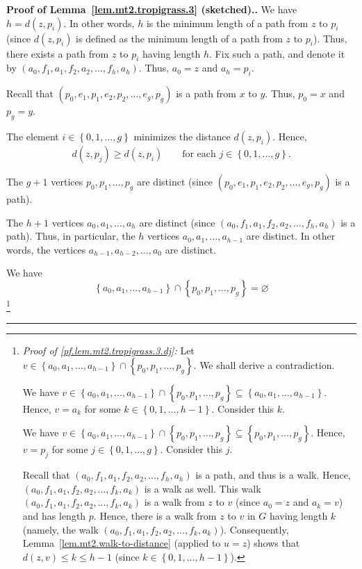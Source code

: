 \documentclass[numbers=enddot,12pt,final,onecolumn,notitlepage]{scrartcl}%
\theoremstyle{definition}
\newenvironment{proof}[1][Proof]{\noindent\textbf{#1.} }{\ \rule{0.5em}{0.5em}}
\newcommand{\set}[1]{\left\{ #1 \right\}}
\newcommand{\tup}[1]{\left( #1 \right)}
\begin{document}
\begin{proof}[Proof of Lemma~\ref{lem.mt2.tropigrass.3} (sketched).]
We have $h = d \tup{z, p_i}$.
In other words, $h$ is the minimum length of a path from $z$
to $p_i$ (since $d \tup{z, p_i}$ is defined as
the minimum length of a path from $z$ to $p_i$).
Thus, there exists a path from $z$ to $p_i$ having length $h$.
Fix such a path, and denote it by
$\tup{a_0, f_1, a_1, f_2, a_2, \ldots, f_h, a_h}$.
Thus, $a_0 = z$ and $a_h = p_i$.

Recall that $\tup{p_0, e_1, p_1, e_2, p_2, \ldots, e_g, p_g}$
is a path from $x$ to $y$.
Thus, $p_0 = x$ and $p_g = y$.

The element $i \in \set{0, 1, \ldots, g}$ minimizes the
distance $d \tup{z, p_i}$. Hence,
\begin{equation}
d \tup{z, p_j} \geq d \tup{z, p_i}
\qquad \text{for each } j \in \set{0, 1, \ldots, g} .
\label{pf.lem.mt2.tropigrass.3.min}
\end{equation}

The $g+1$ vertices $p_0, p_1, \ldots, p_g$ are
distinct
(since $\tup{p_0, e_1, p_1, e_2, p_2, \ldots, e_g, p_g}$ is a
path).

The $h+1$ vertices $a_0, a_1, \ldots, a_h$
are distinct
(since $\tup{a_0, f_1, a_1, f_2, a_2, \ldots, f_h, a_h}$
is a path).
Thus, in particular, the $h$ vertices
$a_0, a_1, \ldots, a_{h-1}$ are distinct.
In other words, the vertices $a_{h-1}, a_{h-2}, \ldots, a_0$ are
distinct.

We have
\begin{equation}
\set{a_0, a_1, \ldots, a_{h-1}} \cap \set{p_0, p_1, \ldots, p_g}
= \varnothing
\label{pf.lem.mt2.tropigrass.3.dj}
\end{equation}
\footnote{\textit{Proof of \eqref{pf.lem.mt2.tropigrass.3.dj}:}
    Let $v \in
    \set{a_0, a_1, \ldots, a_{h-1}} \cap \set{p_0, p_1, \ldots, p_g}$.
    We shall derive a contradiction.

    We have
    $v \in
    \set{a_0, a_1, \ldots, a_{h-1}} \cap \set{p_0, p_1, \ldots, p_g}
    \subseteq \set{a_0, a_1, \ldots, a_{h-1}}$. Hence,
    $v = a_k$ for some $k \in \set{0, 1, \ldots, h-1}$. Consider this
    $k$.

    We have $v \in
    \set{a_0, a_1, \ldots, a_{h-1}} \cap \set{p_0, p_1, \ldots, p_g}
    \subseteq \set{p_0, p_1, \ldots, p_g}$. Hence,
    $v = p_j$ for some $j \in \set{0, 1, \ldots, g}$. Consider this
    $j$. 

    Recall that $\tup{a_0, f_1, a_1, f_2, a_2, \ldots, f_h, a_h}$
    is a path, and thus is a walk. Hence,
    $\tup{a_0, f_1, a_1, f_2, a_2, \ldots, f_k, a_k}$
    is a walk as well. This walk
    $\tup{a_0, f_1, a_1, f_2, a_2, \ldots, f_k, a_k}$
    is a walk from $z$ to $v$ (since
    $a_0 = z$ and $a_k = v$) and has length $p$.
    Hence, there is a walk from $z$ to $v$ in $G$ having length
    $k$ (namely, the walk
    $\tup{a_0, f_1, a_1, f_2, a_2, \ldots, f_k, a_k}$).
    Consequently, Lemma~\ref{lem.mt2.walk-to-distance}
    (applied to $u = z$) shows that
    $d \tup{z, v} \leq k \leq h-1$
    (since $k \in \set{0, 1, \ldots, h-1}$).

}
\end{proof}
\end{document}
